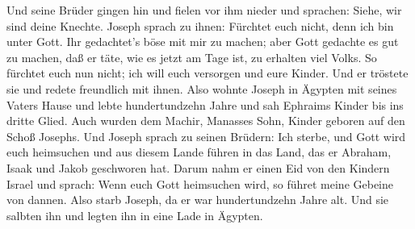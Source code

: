  Und seine Brüder gingen hin und fielen vor ihm nieder und
sprachen: Siehe, wir sind deine Knechte.  Joseph sprach zu
ihnen: Fürchtet euch nicht, denn ich bin unter Gott.  Ihr
gedachtet's böse mit mir zu machen; aber Gott gedachte es gut zu machen,
daß er täte, wie es jetzt am Tage ist, zu erhalten viel Volks.
 So fürchtet euch nun nicht; ich will euch versorgen und
eure Kinder. Und er tröstete sie und redete freundlich mit ihnen.
 Also wohnte Joseph in Ägypten mit seines Vaters Hause und
lebte hundertundzehn Jahre  und sah Ephraims Kinder bis ins
dritte Glied. Auch wurden dem Machir, Manasses Sohn, Kinder geboren auf
den Schoß Josephs.  Und Joseph sprach zu seinen Brüdern:
Ich sterbe, und Gott wird euch heimsuchen und aus diesem Lande führen in
das Land, das er Abraham, Isaak und Jakob geschworen hat. 
Darum nahm er einen Eid von den Kindern Israel und sprach: Wenn euch
Gott heimsuchen wird, so führet meine Gebeine von dannen. 
Also starb Joseph, da er war hundertundzehn Jahre alt. Und sie salbten
ihn und legten ihn in eine Lade in Ägypten.
